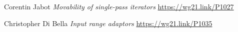 \documentclass{wg21}
\begin{document}
\begin{thebibliography}{9}
	
	Corentin Jabot
	\emph{Movability of single-pass iterators}
	\url{https://wg21.link/P1027}	

	Christopher Di Bella
	\emph{Input range adaptors}\newline
	\url{https://wg21.link/P1035}	
	
	
\end{thebibliography}
\end{document}
